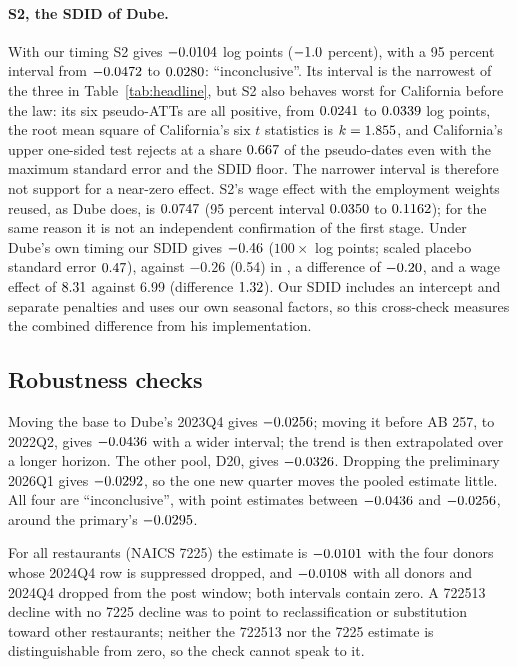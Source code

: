 \paragraph{S2, the SDID of Dube.} With our timing S2 gives $-0.0104$ log points ($-1.0$
percent), with a 95 percent interval from $-0.0472$ to $0.0280$: ``inconclusive''. Its interval
is the narrowest of the three in Table~\ref{tab:headline}, but S2 also behaves worst for California
before the law: its six pseudo-ATTs are all positive, from $0.0241$ to
$0.0339$ log points, the root mean square of California's six $t$ statistics is
$k = 1.855$, and California's upper one-sided test rejects at a share $0.667$ of
the pseudo-dates even with the maximum standard error and the SDID floor. The narrower interval is
therefore not support for a near-zero effect. S2's wage effect with the employment weights reused,
as Dube does, is $0.0747$ (95 percent interval $0.0350$ to $0.1162$); for the same
reason it is not an independent confirmation of the first stage. Under Dube's own timing our SDID
gives $-0.46$ ($100\times$ log points; scaled placebo standard error $0.47$),
against $-0.26$ (0.54) in \citet[Table~1, Panel~A]{dube2026labor}, a difference of
$-0.20$, and a wage effect of $8.31$ against 6.99 (difference
$1.32$). Our SDID includes an intercept and separate penalties and uses our own
seasonal factors, so this cross-check measures the combined difference from his implementation.

\subsection{Robustness checks}
\label{sec:rob-checks}

Moving the base to Dube's 2023Q4 gives $-0.0256$; moving it before AB 257, to 2022Q2, gives
$-0.0436$ with a wider interval; the trend is then extrapolated over a longer horizon. The other pool,
D20, gives $-0.0326$. Dropping the preliminary 2026Q1 gives $-0.0292$, so the one new
quarter moves the pooled estimate little. All four are ``inconclusive'', with point estimates
between $-0.0436$ and $-0.0256$, around the primary's $-0.0295$.

For all restaurants (NAICS 7225) the estimate is $-0.0101$ with the four donors
whose 2024Q4 row is suppressed dropped, and $-0.0108$ with all donors and
2024Q4 dropped from the post window; both intervals contain zero. A 722513 decline with no 7225
decline was to point to reclassification or substitution toward other restaurants; neither the
722513 nor the 7225 estimate is distinguishable from zero, so the check cannot speak to it.

